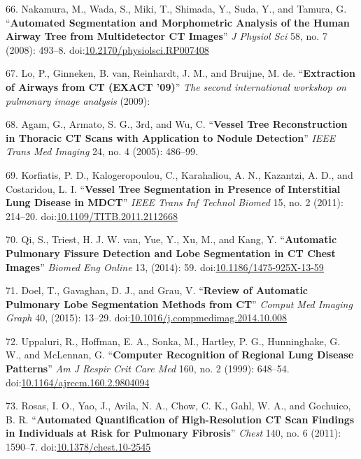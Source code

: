 \documentclass[11pt,]{article}
\begin{document}
\hypertarget{ref-Nakamura:2008aa}{}
66. Nakamura, M., Wada, S., Miki, T., Shimada, Y., Suda, Y., and Tamura,
G. ``\textbf{Automated Segmentation and Morphometric Analysis of the
Human Airway Tree from Multidetector CT Images}'' \emph{J Physiol Sci}
58, no. 7 (2008): 493--8.
doi:\href{https://doi.org/10.2170/physiolsci.RP007408}{10.2170/physiolsci.RP007408}

\hypertarget{ref-Lo:2009aa}{}
67. Lo, P., Ginneken, B. van, Reinhardt, J. M., and Bruijne, M. de.
``\textbf{Extraction of Airways from CT (EXACT '09)}'' \emph{The second
international workshop on pulmonary image analysis} (2009):

\hypertarget{ref-Agam:2005aa}{}
68. Agam, G., Armato, S. G., 3rd, and Wu, C. ``\textbf{Vessel Tree
Reconstruction in Thoracic CT Scans with Application to Nodule
Detection}'' \emph{IEEE Trans Med Imaging} 24, no. 4 (2005): 486--99.

\hypertarget{ref-Korfiatis:2011aa}{}
69. Korfiatis, P. D., Kalogeropoulou, C., Karahaliou, A. N., Kazantzi,
A. D., and Costaridou, L. I. ``\textbf{Vessel Tree Segmentation in
Presence of Interstitial Lung Disease in MDCT}'' \emph{IEEE Trans Inf
Technol Biomed} 15, no. 2 (2011): 214--20.
doi:\href{https://doi.org/10.1109/TITB.2011.2112668}{10.1109/TITB.2011.2112668}

\hypertarget{ref-Qi:2014aa}{}
70. Qi, S., Triest, H. J. W. van, Yue, Y., Xu, M., and Kang, Y.
``\textbf{Automatic Pulmonary Fissure Detection and Lobe Segmentation in
CT Chest Images}'' \emph{Biomed Eng Online} 13, (2014): 59.
doi:\href{https://doi.org/10.1186/1475-925X-13-59}{10.1186/1475-925X-13-59}

\hypertarget{ref-Doel:2015aa}{}
71. Doel, T., Gavaghan, D. J., and Grau, V. ``\textbf{Review of
Automatic Pulmonary Lobe Segmentation Methods from CT}'' \emph{Comput
Med Imaging Graph} 40, (2015): 13--29.
doi:\href{https://doi.org/10.1016/j.compmedimag.2014.10.008}{10.1016/j.compmedimag.2014.10.008}

\hypertarget{ref-Uppaluri:1999aa}{}
72. Uppaluri, R., Hoffman, E. A., Sonka, M., Hartley, P. G.,
Hunninghake, G. W., and McLennan, G. ``\textbf{Computer Recognition of
Regional Lung Disease Patterns}'' \emph{Am J Respir Crit Care Med} 160,
no. 2 (1999): 648--54.
doi:\href{https://doi.org/10.1164/ajrccm.160.2.9804094}{10.1164/ajrccm.160.2.9804094}

\hypertarget{ref-Rosas:2011aa}{}
73. Rosas, I. O., Yao, J., Avila, N. A., Chow, C. K., Gahl, W. A., and
Gochuico, B. R. ``\textbf{Automated Quantification of High-Resolution CT
Scan Findings in Individuals at Risk for Pulmonary Fibrosis}''
\emph{Chest} 140, no. 6 (2011): 1590--7.
doi:\href{https://doi.org/10.1378/chest.10-2545}{10.1378/chest.10-2545}
\end{document}
